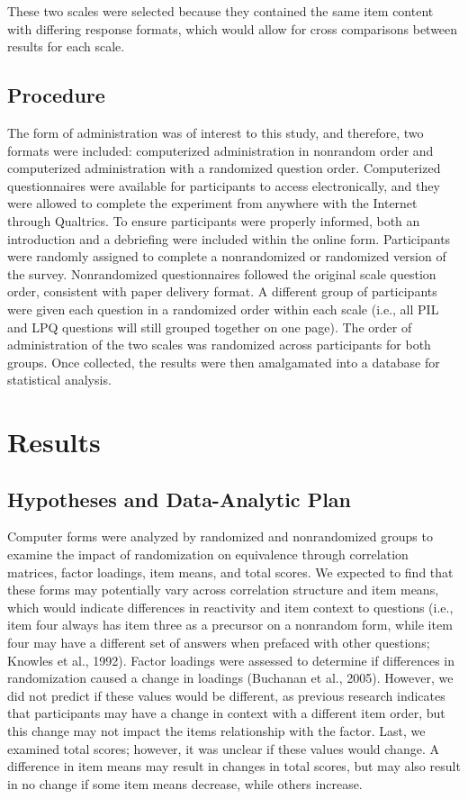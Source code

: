 \documentclass[english,man, mask]{apa6}
\theoremstyle{definition}
\theoremstyle{definition}
\theoremstyle{definition}
\theoremstyle{remark}
\begin{document}
These two scales were selected because they contained the same item
content with differing response formats, which would allow for cross
comparisons between results for each scale.

\subsection{Procedure}\label{procedure}

The form of administration was of interest to this study, and therefore,
two formats were included: computerized administration in nonrandom
order and computerized administration with a randomized question order.
Computerized questionnaires were available for participants to access
electronically, and they were allowed to complete the experiment from
anywhere with the Internet through Qualtrics. To ensure participants
were properly informed, both an introduction and a debriefing were
included within the online form. Participants were randomly assigned to
complete a nonrandomized or randomized version of the survey.
Nonrandomized questionnaires followed the original scale question order,
consistent with paper delivery format. A different group of participants
were given each question in a randomized order within each scale (i.e.,
all PIL and LPQ questions will still grouped together on one page). The
order of administration of the two scales was randomized across
participants for both groups. Once collected, the results were then
amalgamated into a database for statistical analysis.

\section{Results}\label{results}

\subsection{Hypotheses and Data-Analytic
Plan}\label{hypotheses-and-data-analytic-plan}

Computer forms were analyzed by randomized and nonrandomized groups to
examine the impact of randomization on equivalence through correlation
matrices, factor loadings, item means, and total scores. We expected to
find that these forms may potentially vary across correlation structure
and item means, which would indicate differences in reactivity and item
context to questions (i.e., item four always has item three as a
precursor on a nonrandom form, while item four may have a different set
of answers when prefaced with other questions; Knowles et al., 1992).
Factor loadings were assessed to determine if differences in
randomization caused a change in loadings (Buchanan et al., 2005).
However, we did not predict if these values would be different, as
previous research indicates that participants may have a change in
context with a different item order, but this change may not impact the
items relationship with the factor. Last, we examined total scores;
however, it was unclear if these values would change. A difference in
item means may result in changes in total scores, but may also result in
no change if some item means decrease, while others increase.
\end{document}
